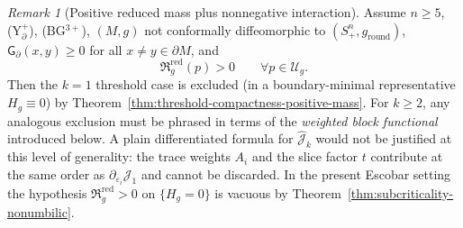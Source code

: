 \documentclass[11pt,reqno,a4paper]{amsart}
\numberwithin{equation}{section}
\theoremstyle{plain}
\theoremstyle{remark}
\newtheorem{remark}[theorem]{Remark}
\theoremstyle{plain}
\begin{document}
\begin{remark}[Positive reduced mass plus nonnegative interaction]
\label{cor:positive-mass-positive-kernel}
Assume $n\ge5$, \textup{(Y$^+_{\partial}$)}, \textup{(BG$^{3+}$)},
$(M,g)$ not conformally diffeomorphic to $(S^n_+,g_{\mathrm{round}})$,
$\mathsf G_\partial(x,y)\ge0$ for all $x\neq y\in\partial M$, and
\[
\mathfrak R_g^{\mathrm{red}}(p)>0
\qquad\forall p\in\mathcal U_g.
\]
Then the $k=1$ threshold case is excluded (in a boundary-minimal representative
$H_g\equiv0$) by Theorem~\ref{thm:threshold-compactness-positive-mass}.
For $k\ge2$, any analogous exclusion must be phrased in terms of the
\emph{weighted block functional} introduced below. A plain differentiated formula for
$\hat{\mathcal J}_k$ would not be justified at this level of generality:
the trace weights $A_i$ and the slice factor $t$ contribute at the same order as
$\partial_{\varepsilon_i}\mathcal J_1$ and cannot be discarded.
In the present Escobar setting the hypothesis
$\mathfrak R_g^{\mathrm{red}}>0$ on $\{H_g=0\}$ is vacuous by
Theorem~\ref{thm:subcriticality-nonumbilic}.
\end{remark}
\end{document}
